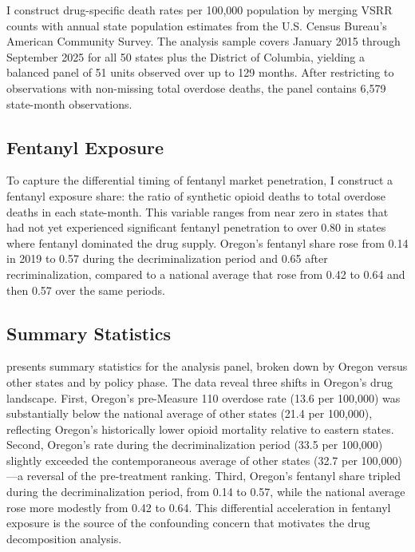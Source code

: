 \documentclass[12pt]{article}
\begin{document}
I construct drug-specific death rates per 100,000 population by merging VSRR counts with annual state population estimates from the U.S. Census Bureau's American Community Survey. The analysis sample covers January 2015 through September 2025 for all 50 states plus the District of Columbia, yielding a balanced panel of 51 units observed over up to 129 months. After restricting to observations with non-missing total overdose deaths, the panel contains 6,579 state-month observations.

\subsection{Fentanyl Exposure}

To capture the differential timing of fentanyl market penetration, I construct a fentanyl exposure share: the ratio of synthetic opioid deaths to total overdose deaths in each state-month. This variable ranges from near zero in states that had not yet experienced significant fentanyl penetration to over 0.80 in states where fentanyl dominated the drug supply. Oregon's fentanyl share rose from 0.14 in 2019 to 0.57 during the decriminalization period and 0.65 after recriminalization, compared to a national average that rose from 0.42 to 0.64 and then 0.57 over the same periods.

\subsection{Summary Statistics}

 presents summary statistics for the analysis panel, broken down by Oregon versus other states and by policy phase. The data reveal three shifts in Oregon's drug landscape. First, Oregon's pre-Measure 110 overdose rate (13.6 per 100,000) was substantially below the national average of other states (21.4 per 100,000), reflecting Oregon's historically lower opioid mortality relative to eastern states. Second, Oregon's rate during the decriminalization period (33.5 per 100,000) slightly exceeded the contemporaneous average of other states (32.7 per 100,000)---a reversal of the pre-treatment ranking. Third, Oregon's fentanyl share tripled during the decriminalization period, from 0.14 to 0.57, while the national average rose more modestly from 0.42 to 0.64. This differential acceleration in fentanyl exposure is the source of the confounding concern that motivates the drug decomposition analysis.


\end{document}

